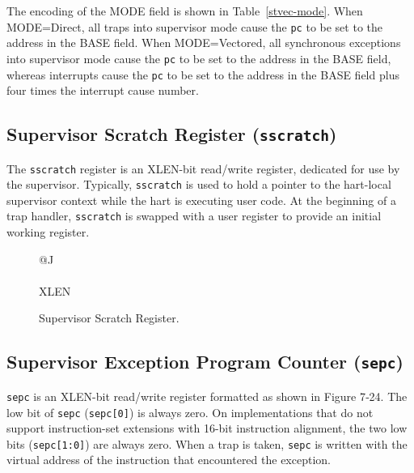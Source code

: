 The encoding of the MODE field is shown in Table~\ref{stvec-mode}.  When
MODE=Direct, all traps into supervisor mode cause the \texttt{pc} to be set to the
address in the BASE field.  When MODE=Vectored, all synchronous exceptions
into supervisor mode cause the \texttt{pc} to be set to the address in the BASE
field, whereas interrupts cause the \texttt{pc} to be set to the address in
the BASE field plus four times the interrupt cause number.

\subsection{Supervisor Scratch Register (\texttt{sscratch})
}\label{supervisor-scratch-register-sscratch}

The \texttt{sscratch} register is an XLEN-bit read/write register, dedicated for
use by the supervisor. Typically, \texttt{sscratch} is used to hold a pointer to
the hart-local supervisor context while the hart is executing user code.
At the beginning of a trap handler, \texttt{sscratch} is swapped with a user
register to provide an initial working register.

\ifdefined\MARKDOWN
\else

\begin{figure}[htb]
	{\footnotesize
		\begin{center}
			\begin{tabular}{@{}J}
				 \\
				\hline
				 \\
				\hline
				XLEN \\
			\end{tabular}
		\end{center}
	}
	\vspace{-0.1in}
	\caption{Supervisor Scratch Register.}
	\label{fig:sscratchreg}
\end{figure}

\fi

\subsection{Supervisor Exception Program Counter
(\texttt{sepc})}\label{supervisor-exception-program-counter-sepc}

\texttt{sepc} is an XLEN-bit read/write register formatted as shown in Figure
7‑24. The low bit of \texttt{sepc} (\texttt{sepc{[}0{]}}) is always zero. On
implementations that do not support instruction-set extensions with
16-bit instruction alignment, the two low bits (\texttt{sepc{[}1:0{]}}) are
always zero. When a trap is taken, \texttt{sepc} is written with the virtual
address of the instruction that encountered the exception.

